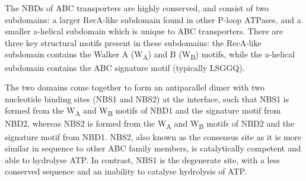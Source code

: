 The NBDs of ABC transporters are highly conserved, and consist of two subdomains: a larger RecA-like subdomain found in other P-loop ATPases, and a smaller \textgreek{a}-helical subdomain which is unique to ABC transporters.
There are three key structural motifs present in these subdomains: the RecA-like subdomain contains the Walker A (W\textsubscript{A}) and B (W\textsubscript{B}) motifs, while the \textgreek{a}-helical subdomain contains the ABC signature motif (typically LSGGQ).

The two domains come together to form an antiparallel dimer with two nucleotide binding sites (NBS1 and NBS2) at the interface, such that NBS1 is formed from the W\textsubscript{A} and W\textsubscript{B} motifs of NBD1 and the signature motif from NBD2, whereas NBS2 is formed from the W\textsubscript{A} and W\textsubscript{B} motifs of NBD2 and the signature motif from NBD1.
NBS2, also known as the consensus site as it is more similar in sequence to other ABC family members, is catalytically competent and able to hydrolyse ATP.
In contrast, NBS1 is the degenerate site, with a less conserved sequence and an inability to catalyse hydrolysis of ATP.

